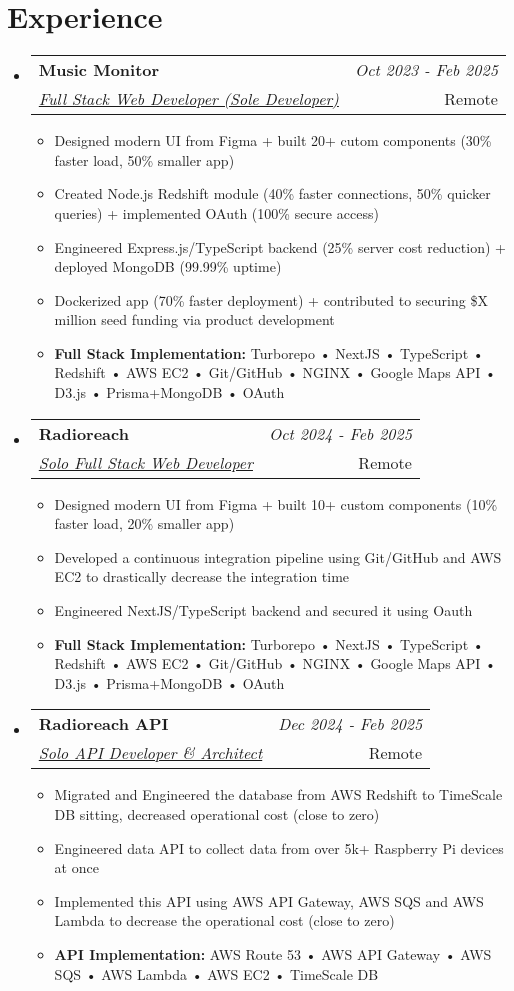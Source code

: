 \documentclass[a4paper,11pt]{article}
\makeatletter
\newcommand{\resumeSubheading}[4]{
\vspace{0.5mm}\item
    \begin{tabular*}{0.98\textwidth}[t]{l@{\extracolsep{\fill}}r}
        \textbf{#1} & \textit{\footnotesize{#4}} \\
        \textit{\footnotesize{#3}} &  \footnotesize{#2}\\
    \end{tabular*}
    \vspace{-2.4mm}
}
\newcommand{\resumeSubHeadingListStart}{\begin{itemize}[leftmargin=*,labelsep=1mm]}
\newcommand{\resumeItemListStart}{\begin{itemize}[leftmargin=*,labelsep=1mm,itemsep=0.5mm]}
\newcommand{\resumeSubHeadingListEnd}{\end{itemize}\vspace{2mm}}
\newcommand{\resumeItemListEnd}{\end{itemize}\vspace{-1mm}}
\makeatother
\begin{document}
\section{\textbf{Experience}}
\vspace{-0.4mm}
  \resumeSubHeadingListStart
  \resumeSubheading
      {{Music Monitor}}{Remote}
      {\underline{Full Stack Web Developer (Sole Developer)}}{Oct 2023 - Feb 2025}
      \resumeItemListStart
        \item Designed modern UI from Figma + built 20+ cutom components (30\% faster load, 50\% smaller app)
        \item Created Node.js Redshift module (40\% faster connections, 50\% quicker queries) + implemented OAuth (100\% secure access)
        \item Engineered Express.js/TypeScript backend (25\% server cost reduction) + deployed MongoDB (99.99\% uptime)
        \item Dockerized app (70\% faster deployment) + contributed to securing \$X million seed funding via product development
        \item\textbf{Full Stack Implementation:} Turborepo • NextJS • TypeScript • Redshift • AWS EC2 • Git/GitHub • NGINX • Google Maps API • D3.js • Prisma+MongoDB • OAuth
      \resumeItemListEnd 
  \resumeSubheading
    {Radioreach}{Remote}
    {\underline{Solo Full Stack Web Developer}}{Oct 2024 - Feb 2025}
    \resumeItemListStart
      \item Designed modern UI from Figma + built 10+ custom components (10\% faster load, 20\% smaller app)
      \item Developed a continuous integration pipeline using Git/GitHub and AWS EC2 to drastically decrease the integration time
      \item Engineered NextJS/TypeScript backend and secured it using Oauth
      \item\textbf{Full Stack Implementation:} Turborepo • NextJS • TypeScript • Redshift • AWS EC2 • Git/GitHub • NGINX • Google Maps API • D3.js • Prisma+MongoDB • OAuth
    \resumeItemListEnd
  \resumeSubheading
    {Radioreach API}{Remote}
    {\underline{Solo API Developer \& Architect}}{Dec 2024 - Feb 2025}
    \resumeItemListStart
      \item Migrated and Engineered the database from AWS Redshift to TimeScale DB sitting, decreased operational cost (close to zero)
      \item Engineered data API to collect data from over 5k+ Raspberry Pi devices at once
      \item Implemented this API using AWS API Gateway, AWS SQS and AWS Lambda to decrease the operational cost (close to zero)
      \item\textbf{API Implementation:} AWS Route 53 • AWS API Gateway • AWS SQS • AWS Lambda • AWS EC2 • TimeScale DB
    \resumeItemListEnd
\resumeSubHeadingListEnd
\end{document}
